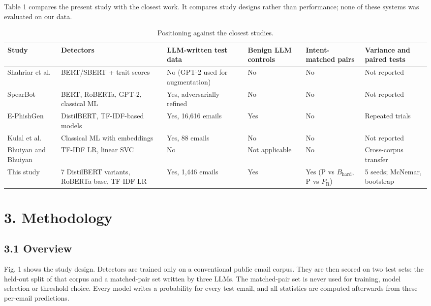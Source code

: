 \documentclass[11pt,letterpaper]{article}
\begin{document}
Table 1 compares the present study with the closest work. It compares study designs rather than performance; none of these systems was evaluated on our data.

\begin{table}[!htbp]
\centering
\footnotesize
\caption{Positioning against the closest studies.}
\begin{tabularx}{\linewidth}{YYYYYY}
\toprule
\textbf{Study} & \textbf{Detectors} & \textbf{LLM-written test data} & \textbf{Benign LLM controls} & \textbf{Intent-matched pairs} & \textbf{Variance and paired tests} \\
\midrule
Shahriar et al. \cite{shahriar2022} & BERT/SBERT + trait scores & No (GPT-2 used for augmentation) & No & No & Not reported \\
SpearBot \cite{qi2025} & BERT, RoBERTa, GPT-2, classical ML & Yes, adversarially refined & No & No & Not reported \\
E-PhishGen \cite{pajola2025} & DistilBERT, TF-IDF-based models & Yes, 16,616 emails & Yes & No & Repeated trials \\
Kulal et al. \cite{kulal2025} & Classical ML with embeddings & Yes, 88 emails & No & No & Not reported \\
Bhuiyan and Bhuiyan \cite{bhuiyan2026} & TF-IDF LR, linear SVC & No & Not applicable & No & Cross-corpus transfer \\
This study & 7 DistilBERT variants, RoBERTa-base, TF-IDF LR & Yes, 1,446 emails & Yes & Yes (P vs $B_{\mathrm{hard}}$, P vs $P_{\mathrm{R}}$) & 5 seeds; McNemar, bootstrap \\
\bottomrule
\end{tabularx}
\end{table}

\section{3. Methodology}

\subsection{3.1 Overview}

Fig. 1 shows the study design. Detectors are trained only on a conventional public email corpus. They are then scored on two test sets: the held-out split of that corpus and a matched-pair set written by three LLMs. The matched-pair set is never used for training, model selection or threshold choice. Every model writes a probability for every test email, and all statistics are computed afterwards from these per-email predictions.
\end{document}

